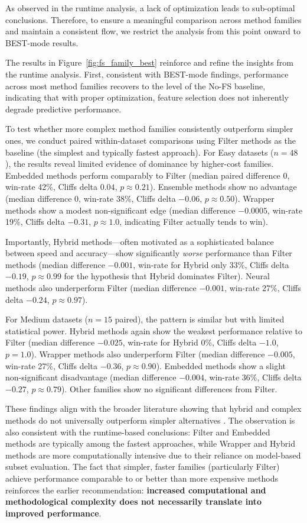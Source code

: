 \documentclass[preprint,12pt,authoryear]{elsarticle}
\begin{document}
{As observed in the runtime analysis, a lack of optimization leads to sub-optimal conclusions. Therefore, to ensure a meaningful comparison across method families and maintain a consistent flow, we restrict the analysis from this point onward to BEST-mode results.

The results in Figure~\ref{fig:fs_family_best} reinforce and refine the insights from the runtime analysis. First, consistent with BEST-mode findings, performance across most method families recovers to the level of the No-FS baseline, indicating that with proper optimization, feature selection does not inherently degrade predictive performance.

To test whether more complex method families consistently outperform simpler ones, we conduct paired within-dataset comparisons using Filter methods as the baseline (the simplest and typically fastest approach). For Easy datasets ($n=48$), the results reveal limited evidence of dominance by higher-cost families. Embedded methods perform comparably to Filter (median paired difference $0$, win-rate 42\%, Cliffs delta $0.04$, $p \approx 0.21$). Ensemble methods show no advantage (median difference $0$, win-rate 38\%, Cliffs delta $-0.06$, $p \approx 0.50$). Wrapper methods show a modest non-significant edge (median difference $-0.0005$, win-rate 19\%, Cliffs delta $-0.31$, $p \approx 1.0$, indicating Filter actually tends to win). 

Importantly, Hybrid methods—often motivated as a sophisticated balance between speed and accuracy—show significantly \emph{worse} performance than Filter methods (median difference $-0.001$, win-rate for Hybrid only 33\%, Cliffs delta $-0.19$, $p \approx 0.99$ for the hypothesis that Hybrid dominates Filter). Neural methods also underperform Filter (median difference $-0.001$, win-rate 27\%, Cliffs delta $-0.24$, $p \approx 0.97$).

For Medium datasets ($n=15$ paired), the pattern is similar but with limited statistical power. Hybrid methods again show the weakest performance relative to Filter (median difference $-0.025$, win-rate for Hybrid 0\%, Cliffs delta $-1.0$, $p = 1.0$). Wrapper methods also underperform Filter (median difference $-0.005$, win-rate 27\%, Cliffs delta $-0.36$, $p \approx 0.90$). Embedded methods show a slight non-significant disadvantage (median difference $-0.004$, win-rate 36\%, Cliffs delta $-0.27$, $p \approx 0.79$). Other families show no significant differences from Filter. 

These findings align with the broader literature showing that hybrid and complex methods do not universally outperform simpler alternatives \cite{nature2024covid,diva2012hybrid,wiley2022hfia,pmc2024hybrid}. The observation is also consistent with the runtime-based conclusions: Filter and Embedded methods are typically among the fastest approaches, while Wrapper and Hybrid methods are more computationally intensive due to their reliance on model-based subset evaluation. The fact that simpler, faster families (particularly Filter) achieve performance comparable to or better than more expensive methods reinforces the earlier recommendation: \textbf{increased computational and methodological complexity does not necessarily translate into improved performance}.

}
\end{document}
